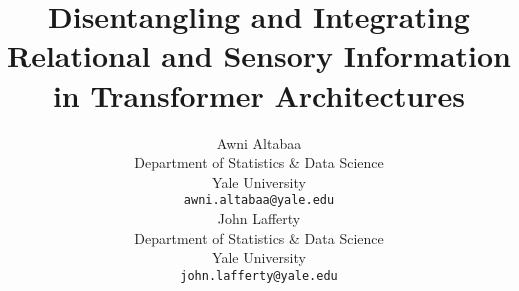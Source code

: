 \documentclass{article}
\title{Disentangling and Integrating Relational and Sensory Information in Transformer Architectures}
\author{%
  Awni Altabaa\\ %
  Department of Statistics \& Data Science\\
  Yale University\\
  \texttt{awni.altabaa@yale.edu} \\
  \And
  John Lafferty \\
  Department of Statistics \& Data Science \\
  Yale University \\
  \texttt{john.lafferty@yale.edu}
}
\begin{document}
\maketitle




















\printbibliography


\listoffixmes

\clearpage
\newpage


\appendix









% 
\end{document}
